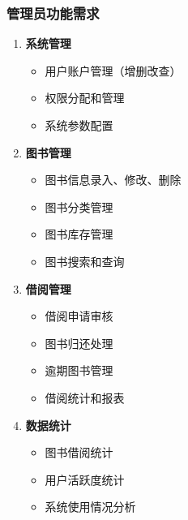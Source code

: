 \documentclass[12pt,a4paper]{article}
\begin{document}
\subsubsection{管理员功能需求}
\begin{enumerate}
    \item \textbf{系统管理}
    \begin{itemize}
        \item 用户账户管理（增删改查）
        \item 权限分配和管理
        \item 系统参数配置
    \end{itemize}
    
    \item \textbf{图书管理}
    \begin{itemize}
        \item 图书信息录入、修改、删除
        \item 图书分类管理
        \item 图书库存管理
        \item 图书搜索和查询
    \end{itemize}
    
    \item \textbf{借阅管理}
    \begin{itemize}
        \item 借阅申请审核
        \item 图书归还处理
        \item 逾期图书管理
        \item 借阅统计和报表
    \end{itemize}
    
    \item \textbf{数据统计}
    \begin{itemize}
        \item 图书借阅统计
        \item 用户活跃度统计
        \item 系统使用情况分析
    \end{itemize}
\end{enumerate}
\end{document}

